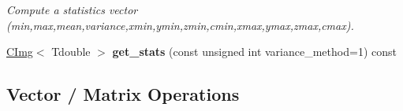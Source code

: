 \begin{DoxyCompactItemize}
\begin{DoxyCompactList}\small\item\em Compute a statistics vector (min,max,mean,variance,xmin,ymin,zmin,cmin,xmax,ymax,zmax,cmax). \item\end{DoxyCompactList}\item 
\hypertarget{structcimg__library_1_1CImg_a0c5808ba8149cd89f983410f9434cfb9}{
\hyperlink{structcimg__library_1_1CImg}{CImg}$<$ Tdouble $>$ {\bfseries get\_\-stats} (const unsigned int variance\_\-method=1) const }
\label{structcimg__library_1_1CImg_a0c5808ba8149cd89f983410f9434cfb9}

\end{DoxyCompactItemize}
\subsection*{Vector / Matrix Operations}
\label{_amgrp6230ddc8599811c22bf0ab1023608482}
